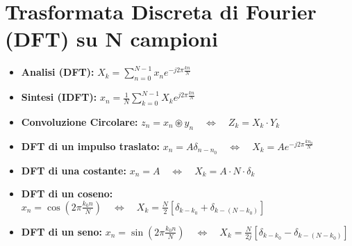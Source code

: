 \section{Trasformata Discreta di Fourier (DFT) su N campioni}
\begin{itemize}
    \item \textbf{Analisi (DFT):} $X_k = \sum_{n=0}^{N-1} x_n e^{-j2\pi \frac{kn}{N}}$
    \item \textbf{Sintesi (IDFT):} $x_n = \frac{1}{N} \sum_{k=0}^{N-1} X_k e^{j2\pi \frac{kn}{N}}$
    \item \textbf{Convoluzione Circolare:} $z_n = x_n \circledast y_n \quad \iff \quad Z_k = X_k \cdot Y_k$
    \item \textbf{DFT di un impulso traslato:} $x_n = A \delta_{n-n_0} \quad \iff \quad X_k = A e^{-j2\pi \frac{kn_0}{N}}$
    \item \textbf{DFT di una costante:} $x_n = A \quad \iff \quad X_k = A \cdot N \cdot \delta_k$
    \item \textbf{DFT di un coseno:} $x_n = \cos\left(2\pi \frac{k_0 n}{N}\right) \quad \iff \quad X_k = \frac{N}{2}[\delta_{k-k_0} + \delta_{k-(N-k_0)}]$
    \item \textbf{DFT di un seno:} $x_n = \sin\left(2\pi \frac{k_0 n}{N}\right) \quad \iff \quad X_k = \frac{N}{2j}[\delta_{k-k_0} - \delta_{k-(N-k_0)}]$
\end{itemize}

